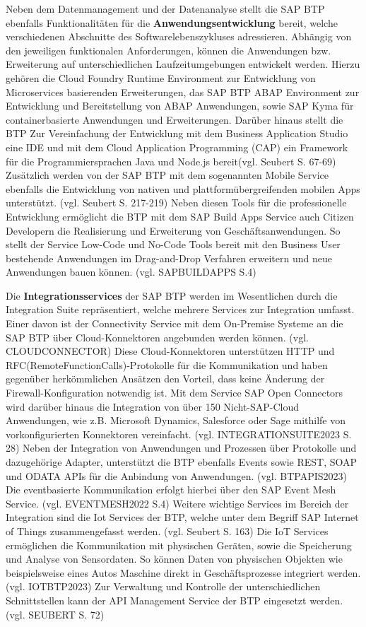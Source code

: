 Neben dem Datenmanagement und der Datenanalyse stellt die SAP BTP ebenfalls Funktionalitäten für die \textbf{Anwendungsentwicklung} bereit, welche verschiedenen Abschnitte des Softwarelebenszykluses adressieren. Abhängig von den jeweiligen funktionalen Anforderungen, können die Anwendungen bzw. Erweiterung auf unterschiedlichen Laufzeitumgebungen entwickelt werden. Hierzu gehören die Cloud Foundry Runtime Environment zur Entwicklung von Microservices basierenden Erweiterungen, das SAP BTP ABAP Environment zur Entwicklung und Bereitstellung von ABAP Anwendungen, sowie SAP Kyma für containerbasierte Anwendungen und Erweiterungen. Darüber hinaus stellt die BTP Zur Vereinfachung der Entwicklung mit dem Business Application Studio eine IDE und mit dem Cloud Application Programming (CAP) ein Framework für die Programmiersprachen Java und Node.js bereit(vgl. Seubert S. 67-69) Zusätzlich werden von der SAP BTP mit dem sogenannten Mobile Service ebenfalls die Entwicklung von nativen und plattformübergreifenden mobilen Apps unterstützt. (vgl. Seubert S. 217-219) Neben diesen Tools für die professionelle Entwicklung ermöglicht die BTP mit dem SAP Build Apps Service auch Citizen Developern die Realisierung und Erweiterung von Geschäftsanwendungen. So stellt der Service Low-Code und No-Code Tools bereit mit den Business User bestehende Anwendungen im Drag-and-Drop Verfahren erweitern und neue Anwendungen bauen können. (vgl. SAPBUILDAPPS S.4) 

Die \textbf{Integrationsservices} der SAP BTP werden im Wesentlichen durch die Integration Suite repräsentiert, welche mehrere Services zur Integration umfasst. Einer davon ist der Connectivity Service mit dem On-Premise Systeme an die SAP BTP über Cloud-Konnektoren angebunden werden können. (vgl. CLOUDCONNECTOR) Diese Cloud-Konnektoren unterstützen HTTP und RFC(RemoteFunctionCalls)-Protokolle für die Kommunikation und haben gegenüber herkömmlichen Ansätzen den Vorteil, dass keine Änderung der Firewall-Konfiguration notwendig ist. Mit dem Service SAP Open Connectors wird darüber hinaus die Integration von über 150 Nicht-SAP-Cloud Anwendungen, wie z.B. Microsoft Dynamics, Salesforce oder Sage mithilfe von vorkonfigurierten Konnektoren vereinfacht. (vgl. INTEGRATIONSUITE2023 S. 28) Neben der Integration von Anwendungen und Prozessen über Protokolle und dazugehörige Adapter, unterstützt die BTP ebenfalls Events sowie REST, SOAP und ODATA APIs für die Anbindung von Anwendungen. (vgl. BTPAPIS2023) Die eventbasierte Kommunikation erfolgt hierbei über den SAP Event Mesh Service. (vgl. EVENTMESH2022 S.4) Weitere wichtige Services im Bereich der Integration sind die Iot Services der BTP, welche unter dem Begriff SAP Internet of Things zusammengefasst werden. (vgl. Seubert S. 163) Die IoT Services ermöglichen die Kommunikation mit physischen Geräten, sowie die Speicherung und Analyse von Sensordaten. So können Daten von physischen Objekten wie beispielsweise eines Autos Maschine direkt in Geschäftsprozesse integriert werden.(vgl. IOTBTP2023)  Zur Verwaltung und Kontrolle der unterschiedlichen Schnittstellen kann der API Management Service der BTP eingesetzt werden. (vgl. SEUBERT S. 72)  

